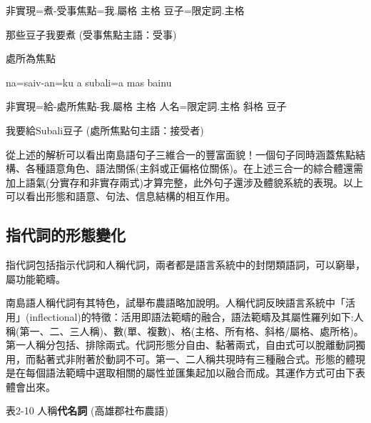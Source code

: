  \textrm{非實現=煮-受事焦點=我.屬格  主格  豆子=限定詞.主格}

 \textrm{那些豆子我要煮 (受事焦點主語：受事)}

\rmfamily
處所為焦點

\begin{listWWviiiNumviiileveli}
\item \begin{styleqwerty}\rmfamily
na=saiv-an=ku  a  subali=a  mas  bainu
\end{styleqwerty}
\end{listWWviiiNumviiileveli}

 \textrm{非實現=給-處所焦點{}-我.屬格  主格  人名=限定詞.主格  斜格  豆子}

 \textrm{我要給Subali豆子 (處所焦點句主語：接受者)}

\textrm{從上述的解析可以看出南島語句子三維合一的豐富面貌！一個句子同時涵蓋焦點結構、各種語意角色、語法關係(主斜或正偏格位關係)}。\textrm{在上述三合一的綜合體還需加上語氣(分實存和非實存兩式)才算完整，此外句子還涉及體貌系統的表現。以上可以看出形態和語意、句法、信息結構的相互作用。}

\subsection{\textrm{指代詞的形態變化}}

\textrm{指代詞包括指示代詞和人稱代詞，兩者都是語言系統中的封閉類語詞，可以窮舉，屬功能範疇。}

\textrm{南島語人稱代詞有其特色，試舉布農語略加說明。人稱代詞反映語言系統中「活用」(inflectional)的特徵：活用即語法範疇的融合，語法範疇及其屬性羅列如下:人稱(第一、二、三人稱)、數(單、複數)}、\textrm{格(主格、所有格、斜格/屬格、處所格)}。\textrm{第一人稱分包括、排除兩式。代詞形態分自由、黏著兩式，自由式可以脫離動詞獨用，而黏著式非附著於動詞不可。第一、二人稱共現時有三種融合式。形態的體現是在每個語法範疇中選取相關的屬性並匯集起加以融合而成。其運作方式可由下表體會出來。}

\textrm{表2-10 人稱}\textrm{\textbf{代名詞} (}高雄郡社布農語)

\tablefirsthead{}


